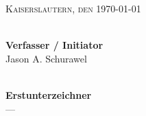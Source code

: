 \documentclass[11pt,a4paper]{article}
\begin{document}
\begin{minipage}{\textwidth}
\vspace{0.2cm}
\begin{flushright}
{\scshape Kaiserslautern, den \today}
\end{flushright}

\vspace{1.1cm} %

\noindent
\begin{minipage}[t]{0.45\textwidth}
  \hrulefill \\[0.4em]
  \textbf{Verfasser / Initiator}\\[0.2em]
  {\small Jason A. Schurawel}
\end{minipage}
\hfill
\begin{minipage}[t]{0.45\textwidth}
  \hrulefill \\[0.4em]
  \textbf{Erstunterzeichner}\\[0.2em]
  {\small ---}
\end{minipage}
\end{minipage}

\newpage


\end{document}
